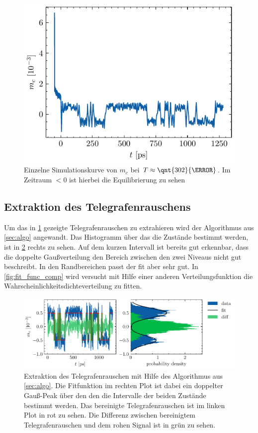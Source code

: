 \documentclass[main.tex]{subfiles}
\begin{document}
\begin{figure}[h]
    \centering
    \includegraphics{bilder/plots/theo-vis/example-telegraph-sim.pdf}
    \caption{Einzelne Simulationskurve von \(m_c\) bei \(T \approx \qnt{302}{\kelvin}\). Im Zeitraum \(<0\) ist hierbei die Equilibrierung zu sehen
    }\label{fig:bsp-run}
\end{figure}

\subsection{Extraktion des Telegrafenrauschens}

Um das in \cref{fig:bsp-run} gezeigte Telegrafenrauschen zu extrahieren wird der Algorithmus aus \cref{sec:algo} angewandt.
Das Histogramm über das die Zustände bestimmt werden, ist in \cref{fig:extraktion-tgr} rechts zu sehen. Auf dem kurzen Intervall ist bereits gut erkennbar, dass die doppelte Gaußverteilung den Bereich zwischen den zwei Niveaus nicht gut beschreibt. In den Randbereichen passt der fit aber sehr gut.  In \cref{fig:fit_func_comp} wird versucht mit Hilfe einer anderen Verteilungsfunktion die Wahrscheinlichkeitsdichteverteilung zu fitten.

\begin{figure}[H]
    \centering
    \includegraphics{bilder/plots/Bz_0mT/mc_fit_hist_part2_26.03meV.pdf}
    \caption{Extraktion des Telegrafenrauschen mit Hilfe des Algorithmus aus \cref{sec:algo}. Die Fitfunktion im rechten Plot ist dabei ein doppelter Gauß-Peak über den den die Intervalle der beiden Zustände bestimmt werden. Das bereinigte Telegrafenrauschen ist im linken Plot in rot zu sehen. Die Differenz zwischen bereinigtem Telegrafenrauschen und dem rohen Signal ist in grün zu sehen.}\label{fig:extraktion-tgr}
\end{figure}
\end{document}
